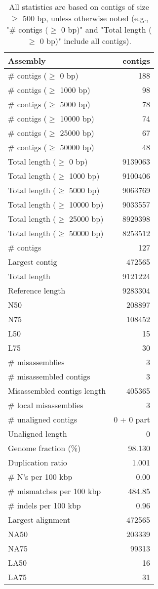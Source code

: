 \documentclass[12pt,a4paper]{article}
\begin{document}
\begin{table}[ht]
\begin{center}
\caption{All statistics are based on contigs of size $\geq$ 500 bp, unless otherwise noted (e.g., "\# contigs ($\geq$ 0 bp)" and "Total length ($\geq$ 0 bp)" include all contigs).}
\begin{tabular}{|l*{1}{|r}|}
\hline
Assembly & contigs \\ \hline
\# contigs ($\geq$ 0 bp) & 188 \\ \hline
\# contigs ($\geq$ 1000 bp) & 98 \\ \hline
\# contigs ($\geq$ 5000 bp) & 78 \\ \hline
\# contigs ($\geq$ 10000 bp) & 74 \\ \hline
\# contigs ($\geq$ 25000 bp) & 67 \\ \hline
\# contigs ($\geq$ 50000 bp) & 48 \\ \hline
Total length ($\geq$ 0 bp) & 9139063 \\ \hline
Total length ($\geq$ 1000 bp) & 9100406 \\ \hline
Total length ($\geq$ 5000 bp) & 9063769 \\ \hline
Total length ($\geq$ 10000 bp) & 9033557 \\ \hline
Total length ($\geq$ 25000 bp) & 8929398 \\ \hline
Total length ($\geq$ 50000 bp) & 8253512 \\ \hline
\# contigs & 127 \\ \hline
Largest contig & 472565 \\ \hline
Total length & 9121224 \\ \hline
Reference length & 9283304 \\ \hline
N50 & 208897 \\ \hline
N75 & 108452 \\ \hline
L50 & 15 \\ \hline
L75 & 30 \\ \hline
\# misassemblies & 3 \\ \hline
\# misassembled contigs & 3 \\ \hline
Misassembled contigs length & 405365 \\ \hline
\# local misassemblies & 3 \\ \hline
\# unaligned contigs & 0 + 0 part \\ \hline
Unaligned length & 0 \\ \hline
Genome fraction (\%) & 98.130 \\ \hline
Duplication ratio & 1.001 \\ \hline
\# N's per 100 kbp & 0.00 \\ \hline
\# mismatches per 100 kbp & 484.85 \\ \hline
\# indels per 100 kbp & 0.96 \\ \hline
Largest alignment & 472565 \\ \hline
NA50 & 203339 \\ \hline
NA75 & 99313 \\ \hline
LA50 & 16 \\ \hline
LA75 & 31 \\ \hline
\end{tabular}
\end{center}
\end{table}
\end{document}
